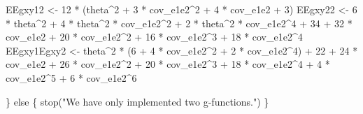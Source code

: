 \documentclass[
  letterpaper,
  DIV=11,
  numbers=noendperiod]{scrartcl}
\newenvironment{Shaded}{\begin{snugshade}}{\end{snugshade}}
\newcommand{\ControlFlowTok}[1]{\textcolor[rgb]{0.00,0.23,0.31}{#1}}
\newcommand{\DecValTok}[1]{\textcolor[rgb]{0.68,0.00,0.00}{#1}}
\newcommand{\FunctionTok}[1]{\textcolor[rgb]{0.28,0.35,0.67}{#1}}
\newcommand{\NormalTok}[1]{\textcolor[rgb]{0.00,0.23,0.31}{#1}}
\newcommand{\OtherTok}[1]{\textcolor[rgb]{0.00,0.23,0.31}{#1}}
\newcommand{\SpecialCharTok}[1]{\textcolor[rgb]{0.37,0.37,0.37}{#1}}
\newcommand{\StringTok}[1]{\textcolor[rgb]{0.13,0.47,0.30}{#1}}
\begin{document}
\begin{Shaded}
\begin{Highlighting}[]
\NormalTok{    EEgxy12 }\OtherTok{\textless{}{-}} \DecValTok{12} \SpecialCharTok{*}\NormalTok{ (theta}\SpecialCharTok{\^{}}\DecValTok{2} \SpecialCharTok{+} \DecValTok{3} \SpecialCharTok{*}\NormalTok{ cov\_e1e2}\SpecialCharTok{\^{}}\DecValTok{2} \SpecialCharTok{+} \DecValTok{4} \SpecialCharTok{*}\NormalTok{ cov\_e1e2 }\SpecialCharTok{+} \DecValTok{3}\NormalTok{)}
\NormalTok{    EEgxy22 }\OtherTok{\textless{}{-}} 
      \DecValTok{6} \SpecialCharTok{*}\NormalTok{ theta}\SpecialCharTok{\^{}}\DecValTok{2} \SpecialCharTok{+} \DecValTok{4} \SpecialCharTok{*}\NormalTok{ theta}\SpecialCharTok{\^{}}\DecValTok{2} \SpecialCharTok{*}\NormalTok{ cov\_e1e2}\SpecialCharTok{\^{}}\DecValTok{2} \SpecialCharTok{+} \DecValTok{2} \SpecialCharTok{*}\NormalTok{ theta}\SpecialCharTok{\^{}}\DecValTok{2} \SpecialCharTok{*}\NormalTok{ cov\_e1e2}\SpecialCharTok{\^{}}\DecValTok{4} \SpecialCharTok{+} \DecValTok{34} \SpecialCharTok{+}
      \DecValTok{32} \SpecialCharTok{*}\NormalTok{ cov\_e1e2 }\SpecialCharTok{+} \DecValTok{20} \SpecialCharTok{*}\NormalTok{ cov\_e1e2}\SpecialCharTok{\^{}}\DecValTok{2} \SpecialCharTok{+} \DecValTok{16} \SpecialCharTok{*}\NormalTok{ cov\_e1e2}\SpecialCharTok{\^{}}\DecValTok{3} \SpecialCharTok{+} \DecValTok{18} \SpecialCharTok{*}\NormalTok{ cov\_e1e2}\SpecialCharTok{\^{}}\DecValTok{4}
\NormalTok{    EEgxy1Egxy2 }\OtherTok{\textless{}{-}} 
\NormalTok{      theta}\SpecialCharTok{\^{}}\DecValTok{2} \SpecialCharTok{*}\NormalTok{ (}\DecValTok{6} \SpecialCharTok{+} \DecValTok{4} \SpecialCharTok{*}\NormalTok{ cov\_e1e2}\SpecialCharTok{\^{}}\DecValTok{2} \SpecialCharTok{+} \DecValTok{2} \SpecialCharTok{*}\NormalTok{ cov\_e1e2}\SpecialCharTok{\^{}}\DecValTok{4}\NormalTok{) }\SpecialCharTok{+} \DecValTok{22} \SpecialCharTok{+} \DecValTok{24} \SpecialCharTok{*}\NormalTok{ cov\_e1e2 }\SpecialCharTok{+}
      \DecValTok{26} \SpecialCharTok{*}\NormalTok{ cov\_e1e2}\SpecialCharTok{\^{}}\DecValTok{2} \SpecialCharTok{+} \DecValTok{20} \SpecialCharTok{*}\NormalTok{ cov\_e1e2}\SpecialCharTok{\^{}}\DecValTok{3} \SpecialCharTok{+} \DecValTok{18} \SpecialCharTok{*}\NormalTok{ cov\_e1e2}\SpecialCharTok{\^{}}\DecValTok{4} \SpecialCharTok{+} \DecValTok{4} \SpecialCharTok{*}\NormalTok{ cov\_e1e2}\SpecialCharTok{\^{}}\DecValTok{5} \SpecialCharTok{+}
      \DecValTok{6} \SpecialCharTok{*}\NormalTok{ cov\_e1e2}\SpecialCharTok{\^{}}\DecValTok{6}

\NormalTok{  \} }\ControlFlowTok{else}\NormalTok{ \{}
    \FunctionTok{stop}\NormalTok{(}\StringTok{"We have only implemented two g{-}functions."}\NormalTok{)}
\NormalTok{  \}}


\end{Highlighting}
\end{Shaded}
\end{document}
